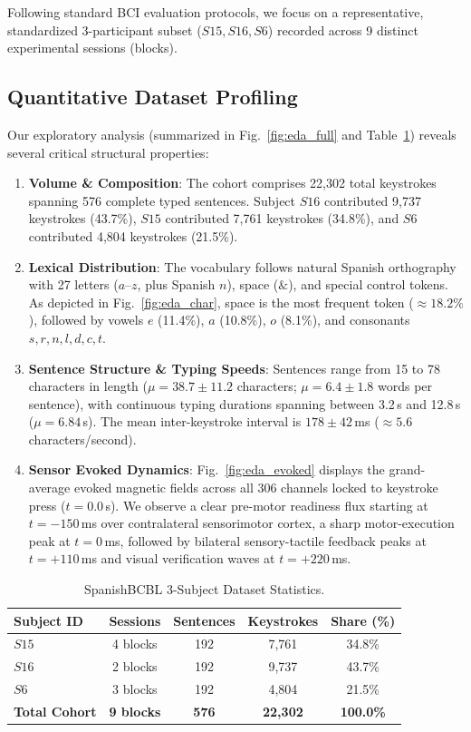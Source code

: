 \documentclass[conference]{IEEEtran}
\begin{document}
Following standard BCI evaluation protocols, we focus on a representative, standardized 3-participant subset ($S15, S16, S6$) recorded across 9 distinct experimental sessions (blocks).

\subsection{Quantitative Dataset Profiling}
Our exploratory analysis (summarized in Fig.~\ref{fig:eda_full} and Table~\ref{tab:eda_stats}) reveals several critical structural properties:
\begin{enumerate}
    \item \textbf{Volume \& Composition}: The cohort comprises 22,302 total keystrokes spanning 576 complete typed sentences. Subject $S16$ contributed 9,737 keystrokes (43.7\%), $S15$ contributed 7,761 keystrokes (34.8\%), and $S6$ contributed 4,804 keystrokes (21.5\%).
    \item \textbf{Lexical Distribution}: The vocabulary follows natural Spanish orthography with 27 letters ($a$--$z$, plus Spanish $n$), space ($\&$), and special control tokens. As depicted in Fig.~\ref{fig:eda_char}, space is the most frequent token ($\approx 18.2\%$), followed by vowels $e$ (11.4\%), $a$ (10.8\%), $o$ (8.1\%), and consonants $s, r, n, l, d, c, t$.
    \item \textbf{Sentence Structure \& Typing Speeds}: Sentences range from 15 to 78 characters in length ($\mu = 38.7 \pm 11.2$ characters; $\mu = 6.4 \pm 1.8$ words per sentence), with continuous typing durations spanning between 3.2\,s and 12.8\,s ($\mu = 6.84$\,s). The mean inter-keystroke interval is $178 \pm 42$\,ms ($\approx 5.6$ characters/second).
    \item \textbf{Sensor Evoked Dynamics}: Fig.~\ref{fig:eda_evoked} displays the grand-average evoked magnetic fields across all 306 channels locked to keystroke press ($t = 0.0$\,s). We observe a clear pre-motor readiness flux starting at $t = -150$\,ms over contralateral sensorimotor cortex, a sharp motor-execution peak at $t = 0$\,ms, followed by bilateral sensory-tactile feedback peaks at $t = +110$\,ms and visual verification waves at $t = +220$\,ms.
\end{enumerate}

\begin{table}[t]
\centering
\caption{SpanishBCBL 3-Subject Dataset Statistics.}
\label{tab:eda_stats}
\begin{tabular}{@{}lcccc@{}}
\toprule
\textbf{Subject ID} & \textbf{Sessions} & \textbf{Sentences} & \textbf{Keystrokes} & \textbf{Share (\%)} \\
\midrule
$S15$ & 4 blocks & 192 & 7,761 & 34.8\% \\
$S16$ & 2 blocks & 192 & 9,737 & 43.7\% \\
$S6$  & 3 blocks & 192 & 4,804 & 21.5\% \\
\midrule
\textbf{Total Cohort} & \textbf{9 blocks} & \textbf{576} & \textbf{22,302} & \textbf{100.0\%} \\
\bottomrule
\end{tabular}
\end{table}
\end{document}
